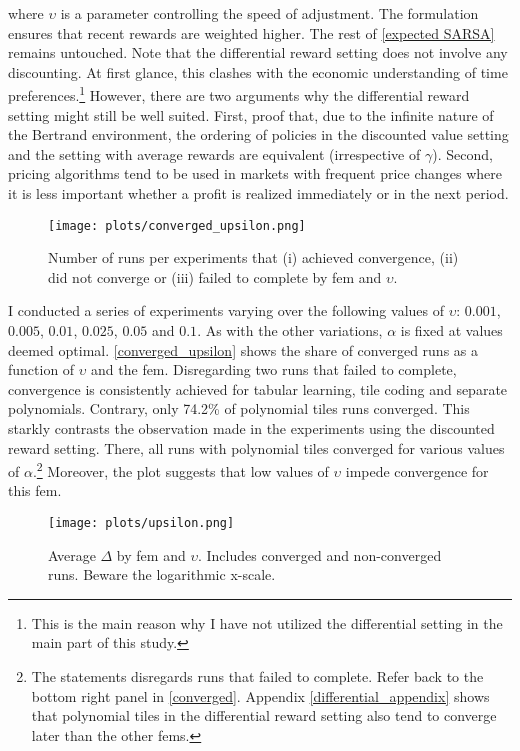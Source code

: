 where $\upsilon$ is a parameter controlling the speed of adjustment. The formulation ensures that recent rewards are weighted higher. The rest of \autoref{expected SARSA} remains untouched. Note that the differential reward setting does not involve any discounting. At first glance, this clashes with the economic understanding of time preferences.\footnote{This is the main reason why I have not utilized the differential setting in the main part of this study.} However, there are two arguments why the differential reward setting might still be well suited. First, \textcite[pp.253-254]{sutton_reinforcement_2018} proof that, due to the infinite nature of the Bertrand environment, the ordering of policies in the discounted value setting and the setting with average rewards are equivalent (irrespective of $\gamma$). Second, pricing algorithms tend to be used in markets with frequent price changes where it is less important whether a profit is realized immediately or in the next period.


\begin{figure}
	\texttt{[image: plots/converged\_upsilon.png]}
	\caption[Converged runs by \gls{fem} and $\upsilon$]{Number of runs per experiments that (i) achieved convergence, (ii) did not converge or (iii) failed to complete by \gls{fem} and $\upsilon$.}
	\label{converged_upsilon}
\end{figure}

I conducted a series of experiments varying over the following values of $\upsilon$: $0.001$, $0.005$, $0.01$, $0.025$, $0.05$ and $0.1$. As with the other variations, $\alpha$ is fixed at values deemed optimal. \autoref{converged_upsilon} shows the share of converged runs as a function of $\upsilon$ and the \gls{fem}. Disregarding two runs that failed to complete, convergence is consistently achieved for tabular learning, tile coding and separate polynomials. Contrary, only 74.2\% of polynomial tiles runs converged. This starkly contrasts the observation made in the experiments using the discounted reward setting. There, all runs with polynomial tiles converged for various values of $\alpha$.\footnote{The statements disregards runs that failed to complete. Refer back to the bottom right panel in \autoref{converged}. Appendix \ref{differential_appendix} shows that polynomial tiles in the differential reward setting also tend to converge later than the other \gls{fem}s.} Moreover, the plot suggests that low values of $\upsilon$ impede convergence for this \gls{fem}.


 \begin{figure}
	\texttt{[image: plots/upsilon.png]}
	\caption[Average $\Delta$ by \gls{fem} and $\upsilon$]{Average $\Delta$ by \gls{fem} and $\upsilon$. Includes converged and non-converged runs. Beware the logarithmic x-scale.}
	\label{upsilon}
\end{figure}



